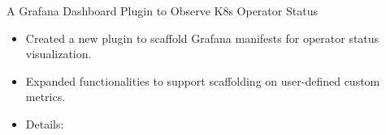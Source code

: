 \documentclass{resume}
\begin{document}
A Grafana Dashboard Plugin to Observe K8s Operator Status
\begin{itemize}
  \item Created a new plugin to scaffold Grafana manifests for operator status visualization.
  \item Expanded functionalities to support scaffolding on user-defined custom metrics.
  \item Details:
     \textperiodcentered\
     \textperiodcentered\
\end{itemize}




%
%
\end{document}
